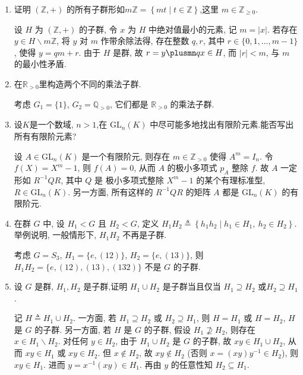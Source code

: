 \begin{enumerate}
\item 证明 $\left(\mathbb{Z}, +\right)$ 的所有子群形如$m\mathbb{Z} = \left\{mt \mid t \in \mathbb{Z}\right\}$,这里 $m \in \mathbb{Z}_{\geqslant 0}$.
\begin{solution}
    设 $H$ 为 $\left(\mathbb{Z}, +\right)$ 的子群, 
    令 $x$ 为 $H$ 中绝对值最小的元素, 记 $m=|x|$. 
    若存在 $y\in H\backslash m\mathbb{Z}$, 将 $y$ 对 $m$ 作带余除法得, 
    存在整数 $q,r$, 其中 $r\in\{0,1,\dots,m-1\}$, 使得 $y=qm+r$. 
    由于 $H$ 是群, 故 $r=y\plusmn qx \in H$, 而 $|r|<m$, 与 $m$ 的最小性矛盾. 
\end{solution}

\item 在$\mathbb{R}_{>0}$里构造两个不同的乘法子群.
\begin{solution}
    考虑 $G_1=\{1\}$, $G_2=\mathbb{Q}_{>0}$, 它们都是 $\mathbb{R}_{>0}$ 的乘法子群. 
\end{solution}

\item 设$K$是一个数域, $n>1$,在 $\mathrm{GL}_{n}(K)$ 中尽可能多地找出有限阶元素.能否写出所有有限阶元素?
\begin{solution}
    设 $A\in\mathrm{GL}_{n}(K)$ 是一个有限阶元, 则存在 $m\in\mathbb{Z}_{>0}$ 使得 $A^m=I_n$. 
    令 $f(X)=X^m-1$, 则 $f(A)=0$, 从而 $A$ 的极小多项式 $p_A$ 整除 $f$. 
    故 $A$ 一定形如 $R^{-1}QR$, 其中 $Q$ 是 极小多项式整除 $X^m-1$ 的某个有理标准型, $R\in\mathrm{GL}_{n}(K)$.
    另一方面, 所有这样的 $R^{-1}QR$ 的矩阵 $A$ 都是 $\mathrm{GL}_n(K)$ 的有限阶元. 
\end{solution}

\item 在群 $G$ 中, 设 $H_1<G$ 且 $H_2<G$, 定义 $H_1H_2\triangleq\left\{h_1h_2 \mid h_1 \in H_1,\ h_2 \in H_2\right\}$. 
举例说明, 一般情形下, $H_1H_2$ 不再是子群. 
\begin{solution}
    考虑 $G=S_3$, $H_1=\{e,(12)\}$, $H_2=\{e,(13)\}$,
    则 $H_1H_2=\{e,(12),(13),(132)\}$ 不是 $G$ 的子群. 
\end{solution}

\item 设 $G$ 是群, $H_{1},H_{2}$ 是子群,证明 $H_{1} \cup H_{2}$ 是子群当且仅当 $H_{1} \supseteq H_{2}$ 或$H_{2} \supseteq H_{1}$.
\begin{solution}
    记 $H\triangleq H_1\cup H_2$.
    一方面,
    若 $H_1\supseteq H_2$ 或 $H_2\supseteq H_1$,
    则 $H=H_1$ 或 $H=H_2$,
    $H$ 是 $G$ 的子群.
    另一方面,
    若 $H$ 是 $G$ 的子群,
    假设 $H_1\not\supseteq H_2$,
    则存在 $x\in H_1\backslash H_2$.
    对任何 $y\in H_2$,
    由于 $H_1\cup H_2$ 是 $G$ 的子群,
    故 $xy\in H_1\cup H_2$,
    从而 $xy\in H_1$ 或 $xy\in H_2$.
    但 $x\notin H_2$,
    故 $xy\notin H_2$ (否则 $x=(xy)y^{-1}\in H_2$),
    则 $xy\in H_1$. 
    进而 $y=x^{-1}(xy)\in H_1$.
    再由 $y$ 的任意性知 $H_2\subseteq H_1$. 
\end{solution}


\end{enumerate}
